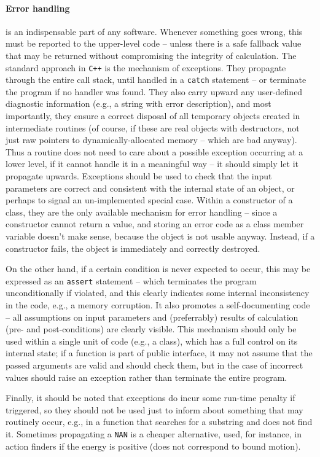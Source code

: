 \documentclass[12pt]{article}
\newcommand{\Cpp}  {\texttt{C++}\xspace}
\begin{document}
\paragraph{Error handling} \label{sec:Exceptions}  is an indispensable part of any software. Whenever something goes wrong, this must be reported to the upper-level code -- unless there is a safe fallback value that may be returned without compromising the integrity of calculation. The standard approach in \Cpp is the mechanism of exceptions. They propagate through the entire call stack, until handled in a \texttt{catch} statement -- or terminate the program if no handler was found. They also carry upward any user-defined diagnostic information (e.g., a string with error description), and most importantly, they ensure a correct disposal of all temporary objects created in intermediate routines (of course, if these are real objects with destructors, not just raw pointers to dynamically-allocated memory -- which are bad anyway). 
Thus a routine does not need to care about a possible exception occurring at a lower level, if it cannot handle it in a meaningful way -- it should simply let it propagate upwards. Exceptions should be used to check that the input parameters are correct and consistent with the internal state of an object, or perhaps to signal an un-implemented special case. Within a constructor of a class, they are the only available mechanism for error handling -- since a constructor cannot return a value, and storing an error code as a class member variable doesn't make sense, because the object is not usable anyway. Instead, if a constructor fails, the object is immediately and correctly destroyed.

On the other hand, if a certain condition is never expected to occur, this may be expressed as an \texttt{assert} statement -- which terminates the program unconditionally if violated, and this clearly indicates some internal inconsistency in the code, e.g., a memory corruption. It also promotes a self-documenting code -- all assumptions on input parameters and (preferrably) results of calculation (pre- and post-conditions) are clearly visible. This mechanism should only be used within a single unit of code (e.g., a class), which has a full control on its internal state; if a function is part of public interface, it may not assume that the passed arguments are valid and should check them, but in the case of incorrect values should raise an exception rather than terminate the entire program.

Finally, it should be noted that exceptions do incur some run-time penalty if triggered, so they should not be used just to inform about something that may routinely occur, e.g., in a function that searches for a substring and does not find it. Sometimes propagating a \texttt{NAN} is a cheaper alternative, used, for instance, in action finders if the energy is positive (does not correspond to bound motion).
\end{document}

